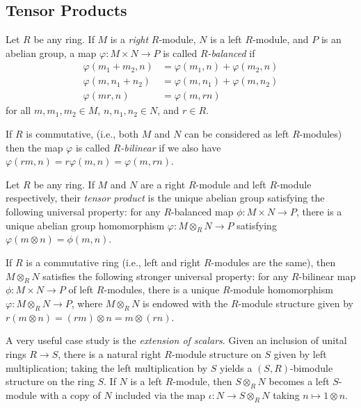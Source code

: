\documentclass[10pt]{mypackage}
\begin{document}
\subsection{Tensor Products}%
\begin{definition}
  Let $R$ be any ring. If $M$ is a \textit{right} $R$-module, $N$ is a left $R$-module, and $P$ is an abelian group, a map $\varphi\colon M\times N\rightarrow P$ is called \textit{$R$-balanced} if
  \begin{align*}
    \varphi\left( m_1 + m_2,n \right) &= \varphi\left( m_1,n \right) + \varphi\left( m_2,n \right)\\
    \varphi\left( m,n_1 + n_2 \right) &= \varphi\left( m,n_1 \right) + \varphi\left( m,n_2 \right)\\
    \varphi\left( mr,n \right) &= \varphi\left( m,rn \right)
  \end{align*}
  for all $m,m_1,m_2\in M$, $n,n_1,n_2\in N$, and $r\in R$.

  If $R$ is commutative, (i.e., both $M$ and $N$ can be considered as left $R$-modules) then the map $\varphi$ is called \textit{$R$-bilinear} if we also have $\varphi\left( rm,n \right) = r\varphi\left( m,n \right) = \varphi\left( m,rn \right)$.
\end{definition}
\begin{definition}
  Let $R$ be any ring. If $M$ and $N$ are a right $R$-module and left $R$-module respectively, their \textit{tensor product} is the unique abelian group satisfying the following universal property: for any $R$-balanced map $\phi\colon M\times N\rightarrow P$, there is a unique abelian group homomorphism $\varphi\colon M\otimes_{R}N\rightarrow P$ satisfying $\varphi\left( m\otimes n \right) = \phi\left( m,n \right)$.

  If $R$ is a commutative ring (i.e., left and right $R$-modules are the same), then $M\otimes_{R}N$ satisfies the following stronger universal property: for any $R$-bilinear map $\phi\colon M\times N\rightarrow P$ of left $R$-modules, there is a unique $R$-module homomorphism $\varphi\colon M\otimes_{R}N\rightarrow P$, where $M\otimes_{R}N$ is endowed with the $R$-module structure given by $r\left( m\otimes n \right)= \left( rm \right)\otimes n = m\otimes \left( rn \right)$.
\end{definition}
A very useful case study is the \textit{extension of scalars}. Given an inclusion of unital rings $R\rightarrow S$, there is a natural right $R$-module structure on $S$ given by left multiplication; taking the left multiplication by $S$ yields a $\left( S,R \right)$-bimodule structure on the ring $S$. If $N$ is a left $R$-module, then $S\otimes_{R}N$ becomes a left $S$-module with a copy of $N$ included via the map $\iota\colon N\rightarrow S\otimes_{R}N$ taking $n\mapsto 1\otimes n$.
\end{document}
